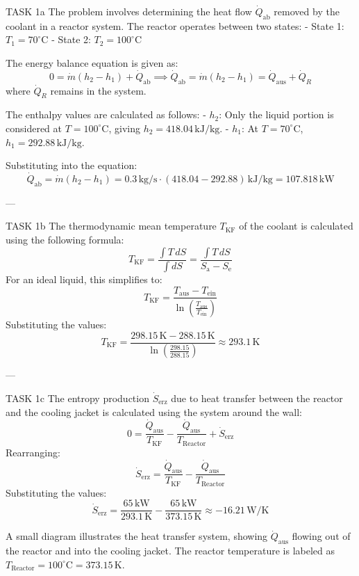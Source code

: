 TASK 1a  
The problem involves determining the heat flow \( \dot{Q}_{\text{ab}} \) removed by the coolant in a reactor system. The reactor operates between two states:  
- State 1: \( T_1 = 70^\circ\text{C} \)  
- State 2: \( T_2 = 100^\circ\text{C} \)  

The energy balance equation is given as:  
\[
0 = \dot{m}(h_2 - h_1) + \dot{Q}_{\text{ab}} \implies \dot{Q}_{\text{ab}} = \dot{m}(h_2 - h_1) = \dot{Q}_{\text{aus}} + \dot{Q}_R
\]  
where \( \dot{Q}_R \) remains in the system.  

The enthalpy values are calculated as follows:  
- \( h_2 \): Only the liquid portion is considered at \( T = 100^\circ\text{C} \), giving \( h_2 = 418.04 \, \text{kJ/kg} \).  
- \( h_1 \): At \( T = 70^\circ\text{C} \), \( h_1 = 292.88 \, \text{kJ/kg} \).  

Substituting into the equation:  
\[
\dot{Q}_{\text{ab}} = \dot{m}(h_2 - h_1) = 0.3 \, \text{kg/s} \cdot (418.04 - 292.88) \, \text{kJ/kg} = 107.818 \, \text{kW}
\]  

---

TASK 1b  
The thermodynamic mean temperature \( T_{\text{KF}} \) of the coolant is calculated using the following formula:  
\[
T_{\text{KF}} = \frac{\int T \, dS}{\int dS} = \frac{\int T \, dS}{S_{\text{a}} - S_{\text{e}}}
\]  
For an ideal liquid, this simplifies to:  
\[
T_{\text{KF}} = \frac{T_{\text{aus}} - T_{\text{ein}}}{\ln\left(\frac{T_{\text{aus}}}{T_{\text{ein}}}\right)}
\]  
Substituting the values:  
\[
T_{\text{KF}} = \frac{298.15 \, \text{K} - 288.15 \, \text{K}}{\ln\left(\frac{298.15}{288.15}\right)} \approx 293.1 \, \text{K}
\]  

---

TASK 1c  
The entropy production \( \dot{S}_{\text{erz}} \) due to heat transfer between the reactor and the cooling jacket is calculated using the system around the wall:  
\[
0 = \frac{\dot{Q}_{\text{aus}}}{T_{\text{KF}}} - \frac{\dot{Q}_{\text{aus}}}{T_{\text{Reactor}}} + \dot{S}_{\text{erz}}
\]  
Rearranging:  
\[
\dot{S}_{\text{erz}} = \frac{\dot{Q}_{\text{aus}}}{T_{\text{KF}}} - \frac{\dot{Q}_{\text{aus}}}{T_{\text{Reactor}}}
\]  
Substituting the values:  
\[
\dot{S}_{\text{erz}} = \frac{65 \, \text{kW}}{293.1 \, \text{K}} - \frac{65 \, \text{kW}}{373.15 \, \text{K}} \approx -16.21 \, \text{W/K}
\]  

A small diagram illustrates the heat transfer system, showing \( \dot{Q}_{\text{aus}} \) flowing out of the reactor and into the cooling jacket. The reactor temperature is labeled as \( T_{\text{Reactor}} = 100^\circ\text{C} = 373.15 \, \text{K} \).